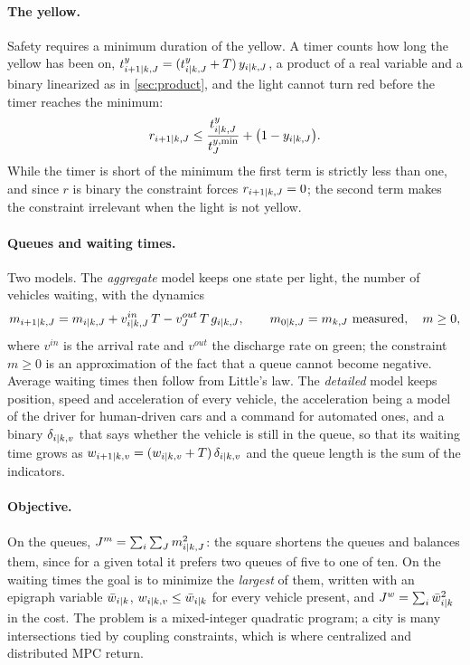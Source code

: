 \paragraph{The yellow.} Safety requires a minimum duration of the yellow. A timer counts how
long the yellow has been on, $t^y_{{i+1|k},J} = (t^y_{{i|k},J} + T)\,y_{{i|k},J}$, a product
of a real variable and a binary linearized as in \cref{sec:product}, and the light cannot turn
red before the timer reaches the minimum:
\begin{equation}
  r_{{i+1|k},J} \le \frac{t^y_{{i|k},J}}{t^{y,\min}_J} + \big(1 - y_{{i|k},J}\big).
\end{equation}
While the timer is short of the minimum the first term is strictly less than one, and since
$r$ is binary the constraint forces $r_{{i+1|k},J} = 0$; the second term makes the constraint
irrelevant when the light is not yellow.

\paragraph{Queues and waiting times.} Two models. The \emph{aggregate} model keeps one state
per light, the number of vehicles waiting, with the dynamics
\begin{equation}
  m_{{i+1|k},J} = m_{{i|k},J} + v^{in}_{{i|k},J}\,T - v^{out}_{J}\,T\,g_{{i|k},J},
  \qquad m_{{0|k},J} = m_{k,J} \text{ measured},\quad m \ge 0,
\end{equation}
where $v^{in}$ is the arrival rate and $v^{out}$ the discharge rate on green; the constraint
$m \ge 0$ is an approximation of the fact that a queue cannot become negative. Average waiting
times then follow from Little's law. The \emph{detailed} model keeps position, speed and
acceleration of every vehicle, the acceleration being a model of the driver for human-driven
cars and a command for automated ones, and a binary $\delta_{{i|k},v}$ that says whether the
vehicle is still in the queue, so that its waiting time grows as $w_{{i+1|k},v} = (w_{{i|k},v}
+ T)\,\delta_{{i|k},v}$ and the queue length is the sum of the indicators.

\paragraph{Objective.} On the queues, $J^m = \sum_i \sum_J m_{{i|k},J}^2$: the square
shortens the queues and balances them, since for a given total it prefers two queues of five
to one of ten. On the waiting times the goal is to minimize the \emph{largest} of them, written
with an epigraph variable $\bar w_{{i|k}}$, $w_{{i|k},v} \le \bar w_{{i|k}}$ for every vehicle
present, and $J^w = \sum_i \bar w_{{i|k}}^2$ in the cost. The problem is a mixed-integer
quadratic program; a city is many intersections tied by coupling constraints, which is where
centralized and distributed MPC return.


